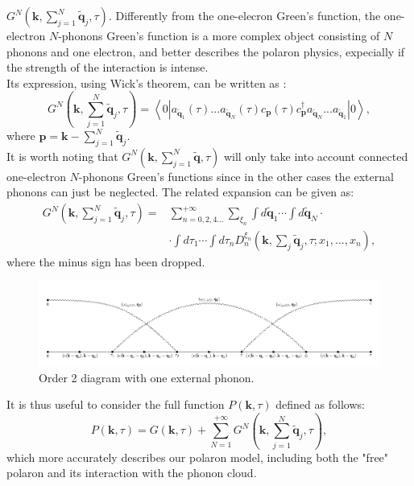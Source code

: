 $G^N(\mathbf{k},\sum_{j=1}^N\mathbf{\tilde{q}}_j,\tau)$. Differently from the one-elecron Green's function, the one-electron $N$-phonons Green's function is a more complex object consisting of 
$N$ phonons and one electron, and better describes the polaron physics, expecially if the strength of the interaction is intense.\\
Its expression, using Wick's theorem, can be written as \cite{hahn2018diagrammatic}:
\begin{equation}
    G^N(\mathbf{k},\sum_{j=1}^N\mathbf{\tilde{q}}_j,\tau)=\left\langle 0|a_{\mathbf{\tilde{q}}_1}(\tau)...a_{\mathbf{\tilde{q}}_N}(\tau)c_{\mathbf{p}}(\tau)c^\dagger_{\mathbf{p}}a_{\mathbf{\tilde{q}}_N}...a_{\mathbf{\tilde{q}}_1} |0\right\rangle,
\end{equation}
where $\mathbf{p}=\mathbf{k}-\sum_{j=1}^N\mathbf{\tilde{q}}_j$.\\
It is worth noting that $G^N(\mathbf{k},\sum_{j=1}^N\mathbf{\tilde{q}},\tau)$ will only take into account connected one-electron $N$-phonons Green's functions since in the other cases the external 
phonons can just be neglected. The related expansion can be given as:
\begin{equation}
\begin{split}
        G^N(\mathbf{k},\sum_{j=1}^N\mathbf{\tilde{q}}_j,\tau)=&\sum_{n=0,2,4...}^{+\infty}\sum_{\xi_n}\int d\mathbf{\tilde{q}}_1\cdots \int d\mathbf{\tilde{q}}_N \cdot \\
         &\cdot\int d\tau_1\cdots\int d\tau_n D_n^{\xi_n}(\mathbf{k},\sum_j\mathbf{\tilde{q}}_j,\tau;x_1,...,x_n),
\end{split}
\label{GF_N_polaron_series}
\end{equation}
where the minus sign has been dropped.
\begin{figure}[H]
    \centering
    \includegraphics[scale = 0.55]{diagram_order_2_N2.pdf}
    \caption{Order 2 diagram with one external phonon.}
    \label{fig:diagram_order_2_N2}
\end{figure}
It is thus useful to consider the full function $P(\mathbf{k},\tau)$ defined as follows:
\begin{equation}
    P(\mathbf{k},\tau)=G(\mathbf{k},\tau)+\sum_{N=1}^{+\infty}G^N(\mathbf{k},\sum_{j=1}^N\mathbf{\tilde{q}}_j,\tau),
\end{equation}
which more accurately describes our polaron model, including both the "free" polaron and its interaction with the phonon cloud.
